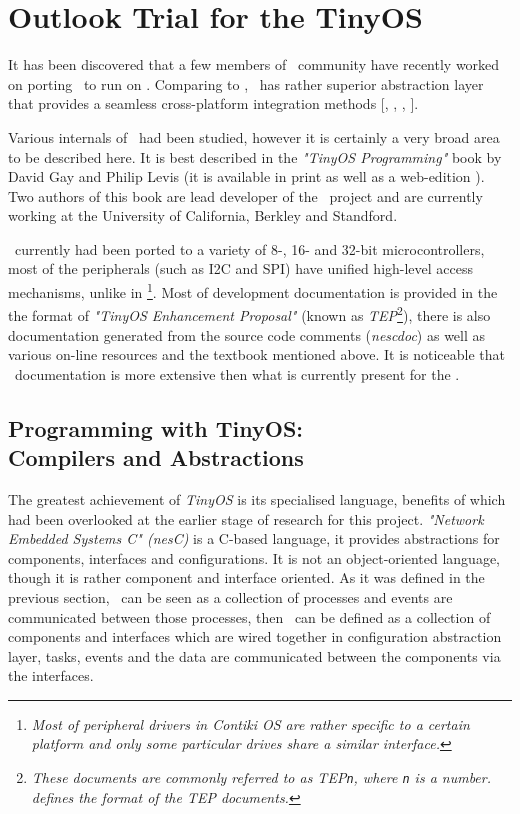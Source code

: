 \section{Outlook Trial for the TinyOS} \label{sec:TINYOS}

  It has been discovered that a few members of \TinyOS\ community
 have recently worked on porting \TinyOS\ to run on 
 \cite{links:tinyos:rfa1:p1,links:tinyos:rfa1:p2}. Comparing to \Contiki,
 \TinyOS\ has rather superior abstraction layer that provides a seamless
 cross-platform integration methods [, , , ].

 
  Various internals of \TinyOS\ had been studied, however it is 
 certainly a very broad area to be described here. It is best described
 in the \emph{"TinyOS Programming"} book by David Gay and Philip Levis
 (it is available in print as well as a web-edition \cite{levis2009tinyos}).
 Two authors of this book are lead developer of the \TinyOS\ project
 and are currently working at the University of California, Berkley
 and Standford.


  \TinyOS\ currently had been ported to a variety of 8-, 16- and
 32-bit microcontrollers, most of the peripherals (such as I2C and SPI)
 have unified high-level access mechanisms, unlike in \Contiki\footnote{
 \emph{Most of peripheral drivers in Contiki OS are rather specific to
 a certain platform and only some particular drives share a similar
 interface.}}. Most of development documentation is provided in the
 the format of \emph{"TinyOS Enhancement Proposal"} (known as
 \emph{TEP}\footnote{\emph{These documents are commonly referred to as
 TEP\texttt{n}, where \texttt{n} is a number.  defines the format
 of the TEP documents.}}), there is also documentation generated from
 the source code comments (\emph{nescdoc}) as well as various on-line
 resources \cite{tinyos:docs} and the textbook mentioned above. It is
 noticeable that \TinyOS\ documentation is more extensive then what is
 currently present for the \ContikiOS.


\subsection{Programming with TinyOS: \\Compilers and Abstractions}

  The greatest achievement of \emph{TinyOS} is its specialised language,
 benefits of which had been overlooked at the earlier stage of research
 for this project. \emph{"Network Embedded Systems C" (nesC)} is a
 C-based language, it provides abstractions for components, interfaces
 and configurations. It is not an object-oriented language, though
 it is rather component and interface oriented. As it was defined in
 the previous section, \Contiki\ can be seen as a collection of
 processes and events are communicated between those processes, then
 \TinyOS\ can be defined as a collection of components and interfaces
 which are wired together in configuration abstraction layer, tasks,
 events and the data are communicated between the components via the
 interfaces.


